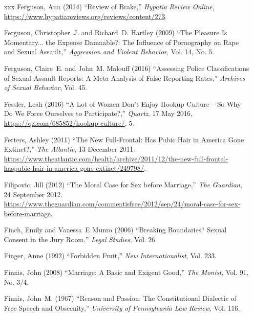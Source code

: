 \documentclass[]{jlreq} \usepackage{mystyle}
\begin{document}
\begin{thebibliography}{xxx}
Ferguson, Ann (2014) ``Review of Brake,'' \emph{Hypatia Review Online},
  \url{https://www.hypatiareviews.org/reviews/content/273}.

Ferguson, Christopher~J. and Richard~D. Hartley (2009) ``The Pleasure Is
  Momentary... the Expense Damnable?: The Influence of Pornography on Rape and
  Sexual Assault,'' \textit{ Aggression and Violent Behavior}, Vol. 14, No. 5.

Ferguson, Claire~E. and John~M. Malouff (2016) ``Assessing Police
  Classifications of Sexual Assault Reports: A Meta-Analysis of False Reporting
  Rates,'' \textit{ Archives of Sexual Behavior}, Vol. 45.

Fessler, Leah (2016) ``A Lot of Women Don't Enjoy Hookup Culture -- So Why Do
  We Force Ourselves to Participate?,'' \emph{Quartz}, 17 May 2016,
  \url{https://qz.com/685852/hookup-culture/}, 5.

Fetters, Ashley (2011) ``The New Full-Frontal: Has Pubic Hair in America Gone
  Extinct?,'' \emph{The Atlantic}, 13 December 2011.
  \url{https://www.theatlantic.com/health/archive/2011/12/the-new-full-frontal-haspubic-hair-in-america-gone-extinct/249798/}.

Filipovic, Jill (2012) ``The Moral Case for Sex before Marriage,'' \emph{The
  Guardian}, 24 September 2012.
  \url{https://www.theguardian.com/commentisfree/2012/sep/24/moral-case-for-sex-before-marriage}.

Finch, Emily and Vanessa~E Munro (2006) ``Breaking Boundaries? Sexual Consent
  in the Jury Room,'' \textit{ Legal Studies}, Vol. 26.

Finger, Anne (1992) ``Forbidden Fruit,'' \textit{ New Internationalist}, Vol.
  233.

Finnis, John (2008) ``Marriage: A Basic and Exigent Good,'' \textit{ The
  Monist}, Vol. 91, No. 3/4.

Finnis, John~M. (1967) ``Reason and Passion: The Constitutional Dialectic of
  Free Speech and Obscenity,'' \textit{ University of Pennsylvania Law Review},
  Vol. 116.


\end{thebibliography}
\end{document}
